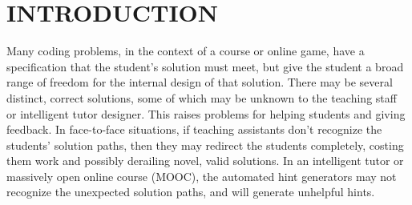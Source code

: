 \documentclass[12pt]{article}
\begin{document}
%

%



\section{INTRODUCTION}


Many coding problems, in the context of a course or online game, have a specification that the student's solution must meet, but give the student a broad range of freedom for the internal design of that solution. There may be several distinct, correct solutions, some of which may be unknown to the teaching staff or intelligent tutor designer. This raises problems for helping students and giving feedback. In face-to-face situations, if teaching assistants don't recognize the students' solution paths, then they may redirect the students completely, costing them work and possibly derailing novel, valid solutions. In an intelligent tutor or massively open online course (MOOC), the automated hint generators may not recognize the unexpected solution paths, and will generate unhelpful hints.
\end{document}
